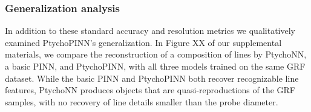 \documentclass[sn-mathphys]{sn-jnl}%
\theoremstyle{thmstyleone}%
\theoremstyle{thmstyletwo}%
\theoremstyle{thmstylethree}%
\begin{document}
\subsubsection{Generalization analysis}
In addition to these standard accuracy and resolution metrics we qualitatively examined PtychoPINN's generalization. In Figure XX of our supplemental materials, we compare the reconstruction of a composition of lines by PtychoNN, a basic PINN, and PtychoPINN, with all three models trained on the same GRF dataset. While the basic PINN and PtychoPINN both recover recognizable line features, PtychoNN produces objects that are quasi-reproductions of the GRF samples, with no recovery of line details smaller than the probe diameter. 


\end{document}
